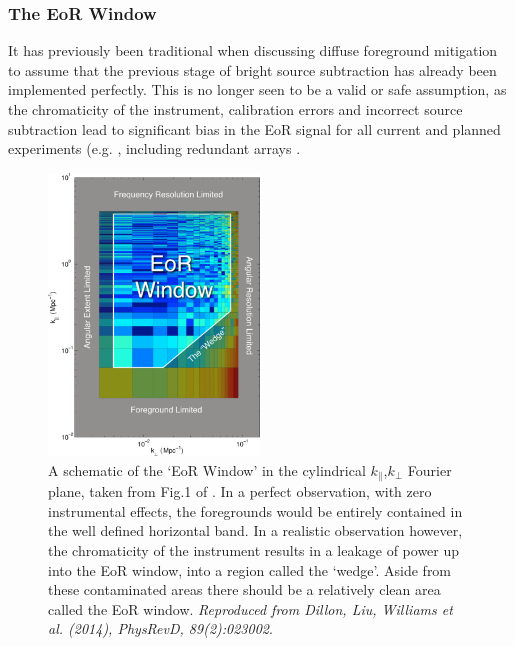 \subsubsection{The EoR Window}
\label{sec:wedge}

It has previously been traditional when discussing diffuse foreground mitigation to assume that the previous stage of bright source subtraction has already been implemented perfectly. This is no longer seen to be a valid or safe assumption, as the chromaticity of the instrument, calibration errors and incorrect source subtraction lead to significant bias in the EoR signal for all current and planned experiments (e.g. \cite{ EW2017MNRAS.470.1849E,Procopio2017PASA...34...33P,Barry2016MNRAS.461.3135B,Patil2016MNRAS.463.4317P,Datta2010ApJ...724..526D,Liu2009MNRAS.394.1575L}, including redundant arrays \cite{Byrne2019ApJ...875...70B}. 

\begin{figure}
\begin{center}
    \includegraphics[width=0.5\textwidth]{Chapman_Jelic/Images/medium.png}
\end{center}
    \caption{A schematic of the `EoR Window' in the cylindrical $k_{\parallel}$,$k_{\perp}$ Fourier plane, taken from Fig.1 of \cite{Dillon2014PhRvD..89b3002D}. In a perfect observation, with zero instrumental effects, the foregrounds would be entirely contained in the well defined horizontal band. In a realistic observation however, the chromaticity of the instrument results in a leakage of power up into the EoR window, into a region called the `wedge'. Aside from these contaminated areas there should be a relatively clean area called the EoR window. \textit{Reproduced from Dillon, Liu, Williams et al. (2014), PhysRevD, 89(2):023002}.} 
    \label{fig:window_liu}
\end{figure}

